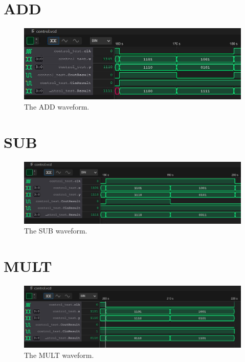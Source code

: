 \documentclass[
	letterpaper, %
	10pt, %
]{CSUniSchoolLabReport}
\begin{document}
\section{ADD}
\begin{figure}[H] %
    \includegraphics[width=\textwidth]{figures/add.JPG} %
    \caption{The ADD waveform.}
\end{figure}
\section{SUB}
\begin{figure}[H] %
    \includegraphics[width=\textwidth]{figures/sub.JPG} %
    \caption{The SUB waveform.}
\end{figure}
\section{MULT}
\begin{figure}[H] %
    \includegraphics[width=\textwidth]{figures/mult.JPG} %
    \caption{The MULT waveform.}
\end{figure}
\end{document}
